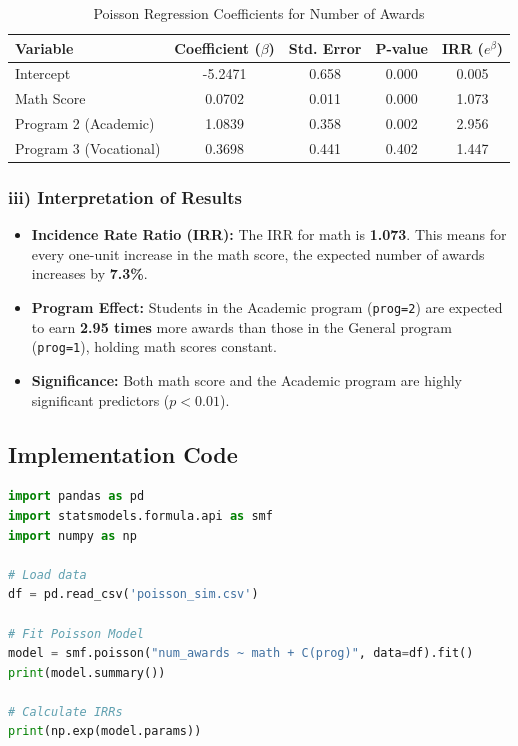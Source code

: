 \documentclass[12pt]{article}
\begin{document}
\begin{table}[h!]
\centering
\caption{Poisson Regression Coefficients for Number of Awards}
\begin{tabular}{@{}lcccc@{}}
\toprule
Variable & Coefficient ($\beta$) & Std. Error & P-value & IRR ($e^\beta$) \\ \midrule
Intercept & -5.2471 & 0.658 & 0.000 & 0.005 \\
Math Score & 0.0702 & 0.011 & 0.000 & 1.073 \\
Program 2 (Academic) & 1.0839 & 0.358 & 0.002 & 2.956 \\
Program 3 (Vocational) & 0.3698 & 0.441 & 0.402 & 1.447 \\ \bottomrule
\end{tabular}
\end{table}

\subsubsection{iii) Interpretation of Results}
\begin{itemize}
    \item \textbf{Incidence Rate Ratio (IRR):} The IRR for math is \textbf{1.073}. This means for every one-unit increase in the math score, the expected number of awards increases by \textbf{7.3\%}.
    \item \textbf{Program Effect:} Students in the Academic program (\texttt{prog=2}) are expected to earn \textbf{2.95 times} more awards than those in the General program (\texttt{prog=1}), holding math scores constant.
    \item \textbf{Significance:} Both math score and the Academic program are highly significant predictors ($p < 0.01$).
\end{itemize}

\subsection{Implementation Code}

\begin{lstlisting}[language=Python, caption=Python implementation for Poisson Regression]
import pandas as pd
import statsmodels.formula.api as smf
import numpy as np

# Load data
df = pd.read_csv('poisson_sim.csv')

# Fit Poisson Model
model = smf.poisson("num_awards ~ math + C(prog)", data=df).fit()
print(model.summary())

# Calculate IRRs
print(np.exp(model.params))
\end{lstlisting}
\end{document}
